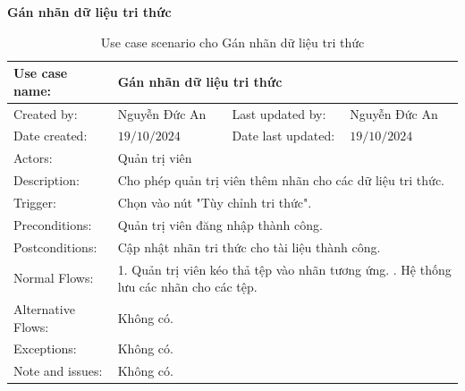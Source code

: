 \textbf{Gán nhãn dữ liệu tri thức}
\begin{table}[H]
	\centering
	\begin{tabular}{|l|l|l|l|} 
		\hline Use case name: & \multicolumn{3}{|l|}{Gán nhãn dữ liệu tri thức} \\ 
		\hline Created by: & Nguyễn Đức An & Last updated by: & Nguyễn Đức An \\ 
		\hline Date created: & $19 / 10 / 2024$ & Date last updated: & $19 / 10 / 2024$\\ 
		\hline Actors: & \multicolumn{3}{|l|}{ Quản trị viên } \\ 
		\hline Description: & \multicolumn{3}{|p{12cm}|}{ Cho phép quản trị viên thêm nhãn cho các dữ liệu tri thức. } \\ 
		\hline Trigger: & \multicolumn{3}{|p{12cm}|}{ Chọn vào nút "Tùy chỉnh tri thức". } \\ 
		\hline Preconditions: & \multicolumn{3}{|p{12cm}|}{ 
			Quản trị viên đăng nhập thành công. 
		} \\ 
		\hline Postconditions: & \multicolumn{3}{|p{12cm}|}{ 
			Cập nhật nhãn tri thức cho tài liệu thành công. 
		} \\ 
		\hline Normal Flows: & \multicolumn{3}{|p{12cm}|}{ 
			1. Quản trị viên kéo thả tệp vào nhãn tương ứng. \newline 
			2. Hệ thống lưu các nhãn cho các tệp. 
		} \\ 
		\hline Alternative Flows: & \multicolumn{3}{|p{12cm}|}{ Không có. } \\ 
		\hline Exceptions: & \multicolumn{3}{|p{12cm}|}{ Không có. } \\ 
		\hline Note and issues: & \multicolumn{3}{|p{12cm}|}{ Không có. } \\ 
		\hline
	\end{tabular}
	\caption{Use case scenario cho Gán nhãn dữ liệu tri thức}
\end{table}

